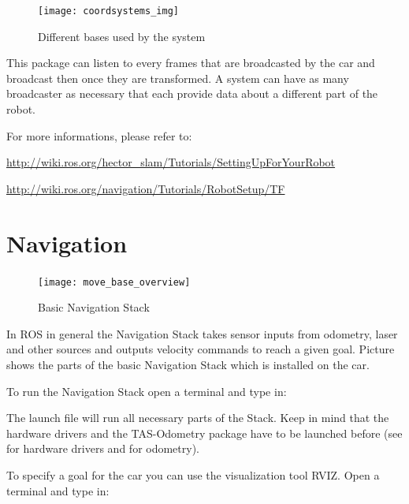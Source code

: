 \begin{figure}[h]
	\centering
		\texttt{[image: coordsystems\_img]}
	\caption{Different bases used by the system}
	\label{fig:Base transformations}
\end{figure}

This package can listen to every frames that are broadcasted by the car and broadcast then once they are transformed. A system can have as many broadcaster as necessary that each provide data about a different part of the robot.

For more informations, please refer to:

\hyperref[http://wiki.ros.org/hector_slam/Tutorials/SettingUpForYourRobot]{http://wiki.ros.org/hector\_slam/Tutorials/SettingUpForYourRobot}

\hyperref[http://wiki.ros.org/navigation/Tutorials/RobotSetup/TF]{http://wiki.ros.org/navigation/Tutorials/RobotSetup/TF}



\newpage
\section{Navigation}
\label{sec:tas_package_navigation}

\begin{figure}[h]
	\centering
		\texttt{[image: move\_base\_overview]}
	\caption{Basic Navigation Stack}
	\label{fig:move_base_overview}
\end{figure}

In ROS in general the Navigation Stack takes sensor inputs from odometry, laser and other sources and outputs velocity commands to reach a given goal. Picture  shows the parts of the basic Navigation Stack which is installed on the car.

To run the Navigation Stack open a terminal and type in:


The launch file will run all necessary parts of the Stack. Keep in mind that the hardware drivers and the TAS-Odometry package have to be launched before (see  for hardware drivers and  for odometry).

To specify a goal for the car you can use the visualization tool RVIZ. Open a terminal and type in:

 \\

